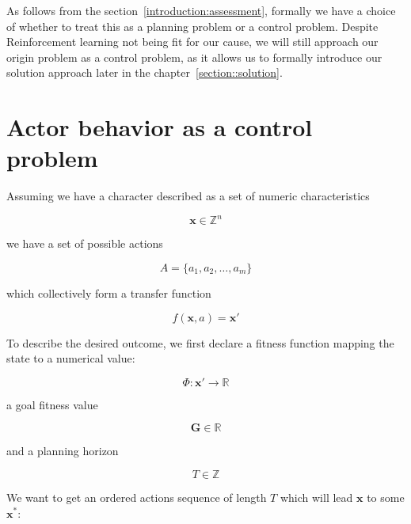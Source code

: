 \documentclass[12pt, a4paper]{report}
\begin{document}
	As follows from the section~\ref{introduction:assessment}, formally we have a choice of whether to treat this as a planning problem or a control problem.
	Despite Reinforcement learning not being fit for our cause, we will still approach our origin problem as a control problem, as it allows us to formally introduce our solution approach later in the chapter~\ref{section::solution}.

	\section{Actor behavior as a control problem}

	Assuming we have a character described as a set of numeric characteristics
	
	\begin{equation}\label{definitions:attributes-amount}
		\mathbf{x} \in \mathbb{Z}^n
	\end{equation}
	
	we have a set of possible actions
	
	\begin{equation}\label{definitions:actions-amount}
		A = \{a_1, a_2,\ldots, a_m\}
	\end{equation}
	
	which collectively form a transfer function
	
	\begin{equation}\label{definitions:transfer-function}
		f(\mathbf{x}, a) = \mathbf{x}'
	\end{equation}

	To describe the desired outcome, we first declare a fitness function mapping the state to a numerical value:
	
	\begin{equation}
		\Phi : \mathbf{x}' \rightarrow \mathbb{R}
	\end{equation} 
	
	a goal fitness value 
	
	\begin{equation}
		\mathbf{G} \in \mathbb{R}
	\end{equation}
	
	and a planning horizon
	
	\begin{equation}
		T \in \mathbb{Z}
	\end{equation}
	
	We want to get an ordered actions sequence of length $T$ which will lead $\mathbf{x}$ to some $\mathbf{x}^*$:
	
\end{document}
